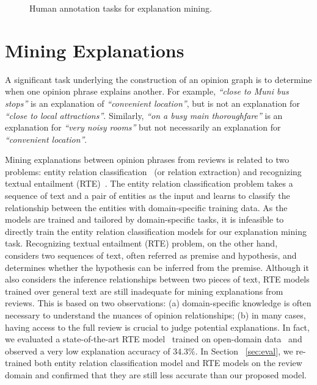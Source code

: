 \begin{figure*}[t]%
    \centering
    \hfill
    \vspace{-2mm}
    \caption{Human annotation tasks for explanation mining.}%
    \label{fig:appen:train}%
\vspace{-2mm}
\end{figure*}


\section{Mining Explanations}\label{sec:exp}
A significant task underlying the construction of an opinion graph is to determine when one opinion phrase explains another. 
For example, \textsl{``close to Muni bus stops''} is an explanation of \textsl{``convenient location''}, but is not an explanation for \textsl{``close to local attractions''}. 
Similarly, \textsl{``on a busy main thoroughfare''} is an explanation for \textsl{``very noisy rooms''} but not necessarily an explanation for \textsl{``convenient location''}. 

Mining explanations between opinion phrases from reviews is related to two problems: entity relation classification~\cite{zhou2016attention, wu2019enriching} (or relation extraction) and recognizing textual entailment (RTE)~\cite{Dagan:2005:PascalRTE}. The entity relation classification problem takes a sequence of text and a pair of entities as the input and learns to classify the relationship between the entities with domain-specific training data. As the models are trained and tailored by domain-specific tasks, it is infeasible to directly train the entity relation classification models for our explanation mining task. Recognizing textual entailment (RTE) problem, on the other hand, considers two sequences of text, often referred as premise and hypothesis, and determines whether the hypothesis can be inferred from the premise. Although it also considers the inference relationships between two pieces of text, RTE models trained over general text are still inadequate for mining explanations from reviews. This is based on two observations: (a) domain-specific knowledge is often necessary to understand the nuances of opinion relationships; (b) in many cases, having access to the full review is crucial to judge potential explanations. 
In fact, we evaluated a state-of-the-art RTE model~\cite{parikh-etal-2016-decomposable} trained on open-domain data~\cite{snli:emnlp2015} and observed a very low explanation accuracy of $34.3\%$. In Section ~\ref{sec:eval}, we re-trained both entity relation classification model and RTE models on the review domain and confirmed that they are still less accurate than our proposed model. 


